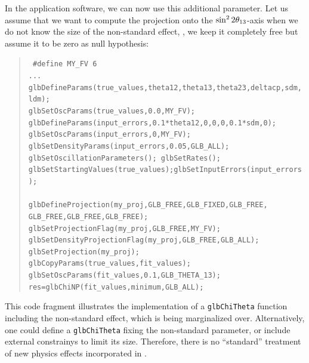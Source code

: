 {In the application software, we can now use this additional parameter. Let us assume that we
want to compute the projection onto the $\sin^2 2 \theta_{13}$-axis when we do not know the size of the  non-standard
effect, \ie, we keep it completely free but assume it to be zero as null hypothesis:
\begin{quote}
{\tt {\footnotesize
 \#define MY\_FV 6 \\
 ... \\
 glbDefineParams(true\_values,theta12,theta13,theta23,deltacp,sdm,ldm); \\
 glbSetOscParams(true\_values,0.0,MY\_FV); \\
 glbDefineParams(input\_errors,0.1*theta12,0,0,0,0.1*sdm,0); \\
 glbSetOscParams(input\_errors,0,MY\_FV);  \\
 glbSetDensityParams(input\_errors,0.05,GLB\_ALL); \\
 glbSetOscillationParameters(); glbSetRates(); \\
 glbSetStartingValues(true\_values);glbSetInputErrors(input\_errors); \\
 \\
 glbDefineProjection(my\_proj,GLB\_FREE,GLB\_FIXED,GLB\_FREE,\\
  \hspace*{2cm} GLB\_FREE,GLB\_FREE,GLB\_FREE); \\
 glbSetProjectionFlag(my\_proj,GLB\_FREE,MY\_FV); \\
 glbSetDensityProjectionFlag(my\_proj,GLB\_FREE,GLB\_ALL); \\
 glbSetProjection(my\_proj);
 \\
 glbCopyParams(true\_values,fit\_values); \\
 glbSetOscParams(fit\_values,0.1,GLB\_THETA\_13); \\
 res=glbChiNP(fit\_values,minimum,GLB\_ALL); 
}}
\end{quote}
This code fragment illustrates the implementation of a {\tt glbChiTheta} function
including the non-standard effect, which is being marginalized over.
Alternatively, one could define a {\tt glbChiTheta} fixing the non-standard
parameter, or include external constrainys to limit its size. Therefore, 
there is no ``standard'' treatment of new physics effects incorporated
in \GLOBES .
}


